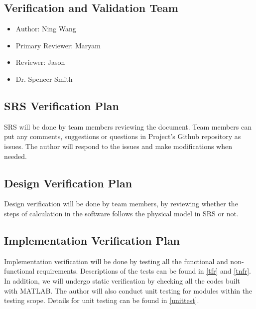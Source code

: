 \documentclass[12pt, titlepage]{article}
\begin{document}
\subsection{Verification and Validation Team}

\begin{itemize}
	\item Author: Ning Wang
\end{itemize}

\begin{itemize}
	\item Primary Reviewer: Maryam
\end{itemize}

\begin{itemize}
	\item Reviewer: Jason
\end{itemize}

\begin{itemize}
	\item Dr. Spencer Smith
\end{itemize}

\subsection{SRS Verification Plan}

SRS will be done by team members reviewing the document. Team members can put any comments, suggestions or questions in Project's Github repository as issues.
The author will respond to the issues and make modifications when needed.

\subsection{Design Verification Plan}

Design verification will be done by team members, by reviewing whether the steps 
of calculation in the software follows the physical model in SRS or not. 

\subsection{Implementation Verification Plan}

Implementation verification will be done by testing all the functional and non-functional requirements. Descriptions of the tests can be found in \autoref{tfr} and \autoref{tnfr}. 
In addition, we will undergo static verification by checking
all the codes built with MATLAB. The author will also conduct unit testing for modules
within the testing scope. Details for unit testing can be found in \autoref{unittest}.
\end{document}
